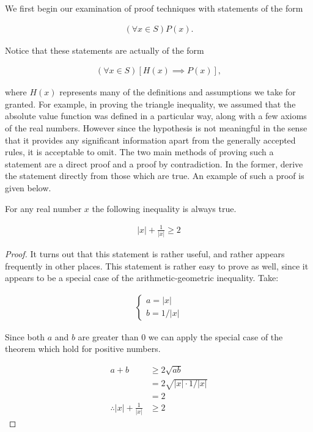 \documentclass{report}
\begin{document}
We first begin our examination of proof techniques with statements of the form

\begin{align*}
	(\forall x \in S)P(x).
\end{align*}

Notice that these statements are actually of the form

\begin{align*}
	(\forall x \in S)[H(x) \implies P(x)],
\end{align*}

where $H(x)$ represents many of the definitions and assumptions we take for granted. For example, in proving the triangle inequality, we assumed that the absolute value function was defined in a particular way, along with a few axioms of the real numbers. However since the hypothesis is not meaningful in the sense that it provides any significant information apart from the generally accepted rules, it is acceptable to omit. The two main methods of proving such a statement are a direct proof and a proof by contradiction. In the former, derive the statement directly from those which are true. An example of such a proof is given below.

\vspace{\baselineskip}
\begin{theorem}
	For any real number $x$ the following inequality is always true.
	
	\begin{align}
		|x| + \frac{1}{|x|} \ge 2
	\end{align}
\end{theorem}

\begin{proof}
	It turns out that this statement is rather useful, and rather appears frequently in other places. This statement is rather easy to prove as well, since it appears to be a special case of the arithmetic-geometric inequality. Take:
	
	\begin{align*}
		\begin{cases}
			a = |x| \\
			b = 1 / |x|
		\end{cases}
	\end{align*}
		
	Since both $a$ and $b$ are greater than 0 we can apply the special case of the theorem which hold for positive numbers.
	
	\begin{align*}
		a + b &\ge 2 \sqrt{ab} \\
		&= 2 \sqrt{|x| \cdot 1 / |x|} \\
		&= 2 \\
		\therefore |x| + \frac{1}{|x|} &\ge 2
	\end{align*}
\end{proof}
\vspace{\baselineskip}
\end{document}
